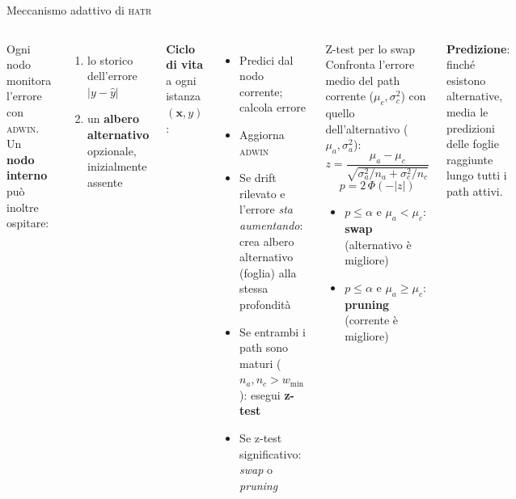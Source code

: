 \documentclass[aspectratio=169,10pt]{beamer}
\newcommand{\hatr}{\textsc{hatr}}
\newcommand{\adwin}{\textsc{adwin}}
\begin{document}
\begin{frame}{Meccanismo adattivo di \hatr{}}
  \begin{columns}[T]
    Ogni nodo monitora l'errore con \adwin{}. Un \textbf{nodo interno}
    può inoltre ospitare:
    \begin{enumerate}
      \item lo storico dell'errore $|y - \hat{y}|$
      \item un \textbf{albero alternativo} opzionale, inizialmente assente
    \end{enumerate}

    \medskip
    \textbf{Ciclo di vita} a ogni istanza $(\mathbf{x}, y)$:
    \begin{itemize}
      \item Predici dal nodo corrente; calcola errore
      \item Aggiorna \adwin{}
      \item \alert{Se drift rilevato} e l'errore \emph{sta aumentando}:
            crea albero alternativo (foglia) alla stessa profondità
      \item \alert{Se entrambi i path sono maturi}
            ($n_a,n_c > w_{\min}$): esegui \textbf{z-test}
      \item Se z-test significativo: \emph{swap} o \emph{pruning}
    \end{itemize}

    \begin{alertblock}{Z-test per lo swap}
      \vspace{2pt}
      Confronta l'errore medio del path corrente ($\mu_c, \sigma_c^2$)
      con quello dell'alternativo ($\mu_a, \sigma_a^2$):
      \[
        z = \frac{\mu_a - \mu_c}{\sqrt{\sigma_a^2/n_a + \sigma_c^2/n_c}}
      \]
      \[
        p = 2\,\Phi(-|z|)
      \]
      \begin{itemize}\small
        \item $p \le \alpha$ e $\mu_a < \mu_c$: \textbf{swap} (alternativo è migliore)
        \item $p \le \alpha$ e $\mu_a \ge \mu_c$: \textbf{pruning} (corrente è migliore)
      \end{itemize}
    \end{alertblock}

    \vspace{2pt}
    \textbf{Predizione}: finché esistono alternative, media le predizioni
    delle foglie raggiunte lungo tutti i path attivi.
  \end{columns}
\end{frame}
\end{document}
